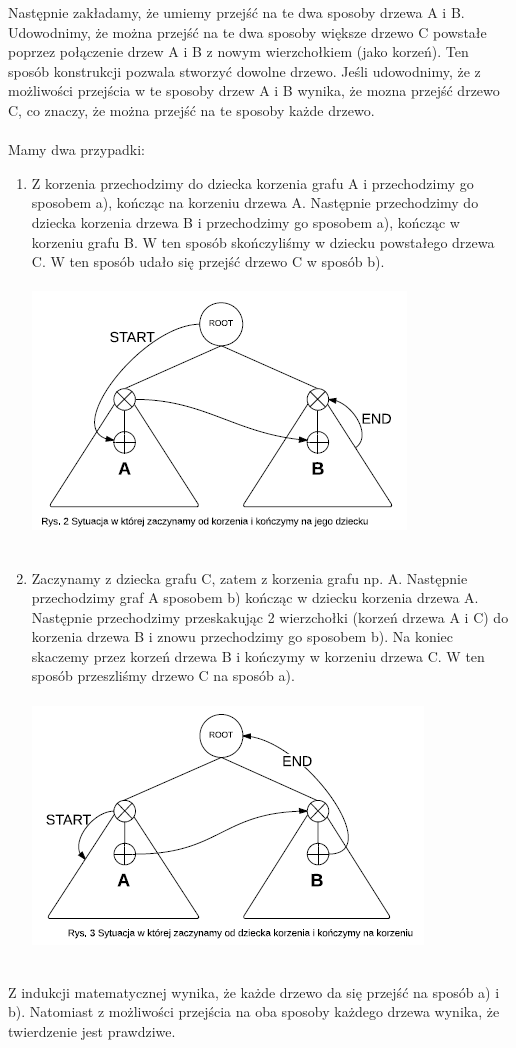 	Następnie zakładamy, że umiemy przejść na te dwa sposoby drzewa A i B. Udowodnimy, że można przejść na te dwa sposoby większe drzewo C powstałe poprzez połączenie drzew A i B z nowym wierzchołkiem (jako korzeń). Ten sposób konstrukcji pozwala stworzyć dowolne drzewo. Jeśli udowodnimy, że z możliwości przejścia w te sposoby drzew A i B wynika, że mozna przejść drzewo C, co znaczy, że można przejść na te sposoby każde drzewo. \\\\

	Mamy dwa przypadki:
	\begin{enumerate}[1]
	\item Z korzenia przechodzimy do dziecka korzenia grafu A i przechodzimy go sposobem a), kończąc na korzeniu drzewa A. Następnie przechodzimy do dziecka korzenia drzewa B i przechodzimy go sposobem a), kończąc w korzeniu grafu B. W ten sposób skończyliśmy w dziecku powstałego drzewa C. W ten sposób udało się przejść drzewo C w sposób b).\\\\
	\includegraphics{rys2}\\\\

	\item Zaczynamy z dziecka grafu C, zatem z korzenia grafu np. A. Następnie przechodzimy graf A sposobem b) kończąc w dziecku korzenia drzewa A. Następnie przechodzimy przeskakując 2 wierzchołki (korzeń drzewa A i C) do korzenia drzewa B i znowu przechodzimy go sposobem b). Na koniec skaczemy przez korzeń drzewa B i kończymy w korzeniu drzewa C. W ten sposób przeszliśmy drzewo C na sposób a).\\\\
	\includegraphics{rys3}\\\\
	\end{enumerate}
	Z indukcji matematycznej wynika, że każde drzewo da się przejść na sposób a) i b). Natomiast z możliwości przejścia na oba sposoby każdego drzewa wynika, że twierdzenie jest prawdziwe.\\\\
